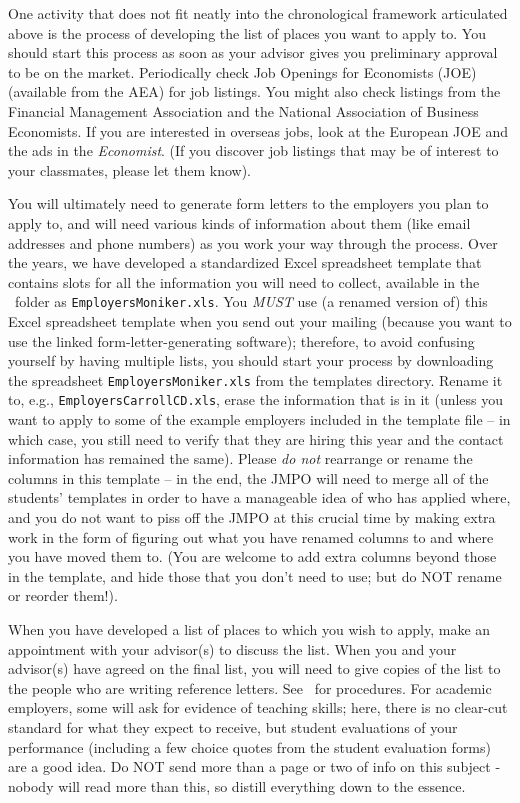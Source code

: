 \documentclass{econtex}
\begin{document}
One activity that does not fit neatly into the chronological framework
articulated above is the process of developing the list of places you
want to apply to.  You should start this process as soon as your
advisor gives you preliminary approval to be on the market.
Periodically check Job Openings for Economists (JOE) (available from
the AEA) for job listings.  You might also check listings from the
Financial Management Association and the National Association of
Business Economists.  If you are interested in overseas jobs, look at
the European JOE and the ads in the {\it Economist}.  (If you discover
job listings that may be of interest to your classmates, please let
them know).

You will ultimately need to generate form letters to the employers you
plan to apply to, and will need various kinds of information about
them (like email addresses and phone numbers) as you work your way
through the process.  Over the years, we have developed a standardized
Excel spreadsheet template that contains slots for all the information
you will need to collect, available in the \Templates~folder as
\texttt{EmployersMoniker.xls}.  You {\it MUST} use (a renamed version
of) this Excel spreadsheet template when you send out your mailing
(because you want to use the linked form-letter-generating software);
therefore, to avoid confusing yourself by having multiple lists, you
should start your process by downloading the spreadsheet
\texttt{EmployersMoniker.xls} from the templates directory.  Rename
it to, e.g., \texttt{EmployersCarrollCD.xls}, erase the information
that is in it (unless you want to apply to some of the example
employers included in the template file -- in which case, you still
need to verify that they are hiring this year and the contact
information has remained the same).  Please {\it do not} rearrange or
rename the columns in this template -- in the end, the JMPO will need
to merge all of the students' templates in order to have a manageable
idea of who has applied where, and you do not want to piss off the
JMPO at this crucial time by making extra work in the form of figuring
out what you have renamed columns to and where you have moved them to.
(You are welcome to add extra columns beyond those in the template,
and hide those that you don't need to use; but do NOT rename or
reorder them!).

When you have developed a list of places to which you wish to apply, make an appointment with your advisor(s) to discuss the list.  When you and your advisor(s) have agreed on the final list, you will need to give copies of the list to the people who are writing reference letters.  See \recLet~for procedures. For academic employers, some will ask for evidence of teaching skills; here, there is no clear-cut standard for what they expect to receive, but student evaluations of your performance (including a few choice quotes from the student evaluation forms) are a good idea.  Do NOT send more than a page or two of info on this subject - nobody will read more than this, so distill everything down to the essence.
\end{document}
